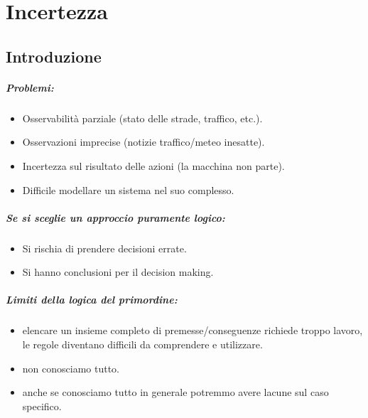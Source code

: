 \chapter{Incertezza}

\section{Introduzione}


\paragraph{Problemi:}

\begin{itemize}
  \item Osservabilità parziale (stato delle strade, traffico, etc.). 
  \item Osservazioni imprecise (notizie traffico/meteo inesatte). 
  \item Incertezza sul risultato delle azioni (la macchina non parte). 
  \item Difficile modellare un sistema nel suo complesso.
\end{itemize}

\paragraph{Se si sceglie un approccio puramente logico:}

\begin{itemize}
  \item Si rischia di prendere decisioni errate. 
  \item Si hanno conclusioni  per il decision making.
\end{itemize}

\paragraph{Limiti della logica del primordine:}

\begin{itemize}
  \item {} elencare un insieme completo di premesse/conseguenze richiede troppo lavoro, le regole diventano difficili da comprendere e utilizzare.
  \item {} non conosciamo tutto. 
  \item {} anche se conosciamo tutto in generale potremmo avere lacune sul caso specifico.
\end{itemize}

